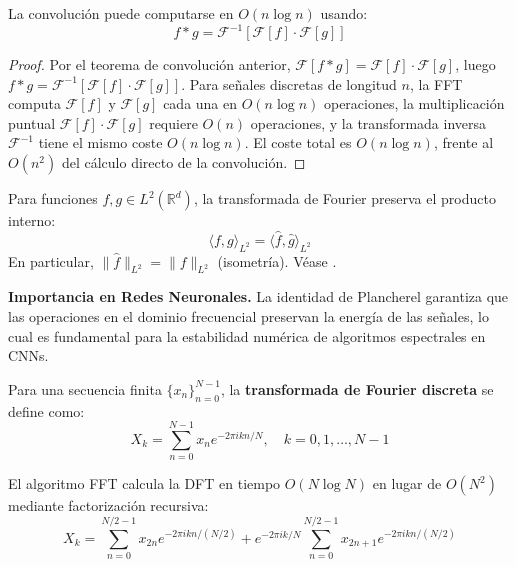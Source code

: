 \begin{corollary}
La convolución puede computarse en \(O(n \log n)\) usando:
\[
f * g = \mathcal{F}^{-1}[\mathcal{F}[f] \cdot \mathcal{F}[g]]
\]
\end{corollary}

\begin{proof}
Por el teorema de convolución anterior, $\mathcal{F}[f * g] = \mathcal{F}[f] \cdot \mathcal{F}[g]$, luego $f * g = \mathcal{F}^{-1}[\mathcal{F}[f] \cdot \mathcal{F}[g]]$. Para señales discretas de longitud $n$, la \gls{FFT} computa $\mathcal{F}[f]$ y $\mathcal{F}[g]$ cada una en $O(n \log n)$ operaciones, la multiplicación puntual $\mathcal{F}[f] \cdot \mathcal{F}[g]$ requiere $O(n)$ operaciones, y la transformada inversa $\mathcal{F}^{-1}$ tiene el mismo coste $O(n \log n)$. El coste total es $O(n \log n)$, frente al $O(n^2)$ del cálculo directo de la convolución.
\end{proof}

\begin{theorem}\label{thm:plancherel}
Para funciones $f, g \in L^2(\mathbb{R}^d)$, la transformada de Fourier preserva el producto interno:
\begin{equation}
\langle f, g \rangle_{L^2} = \langle \hat{f}, \hat{g} \rangle_{L^2}
\end{equation}
En particular, $\|\hat{f}\|_{L^2} = \|f\|_{L^2}$ (isometría). Véase \citep[Theorem~8.29]{Folland1999}.
\end{theorem}

\textbf{Importancia en Redes Neuronales.} La identidad de Plancherel garantiza que las operaciones en el dominio frecuencial preservan la energía de las señales, lo cual es fundamental para la estabilidad numérica de algoritmos espectrales en CNNs.

\begin{definition}\label{def:dft}
Para una secuencia finita $\{x_n\}_{n=0}^{N-1}$, la \textbf{transformada de Fourier discreta} se define como:
\begin{equation}
X_k = \sum_{n=0}^{N-1} x_n e^{-2\pi i kn/N}, \quad k = 0, 1, \ldots, N-1
\end{equation}
\end{definition}

\begin{definition}\label{def:fft}
El algoritmo \gls{FFT} calcula la DFT en tiempo $O(N \log N)$ en lugar de $O(N^2)$ mediante factorización recursiva:
\begin{equation}
X_k = \sum_{n=0}^{N/2-1} x_{2n} e^{-2\pi i kn/(N/2)} + e^{-2\pi i k/N} \sum_{n=0}^{N/2-1} x_{2n+1} e^{-2\pi i kn/(N/2)}
\end{equation}
\end{definition}


